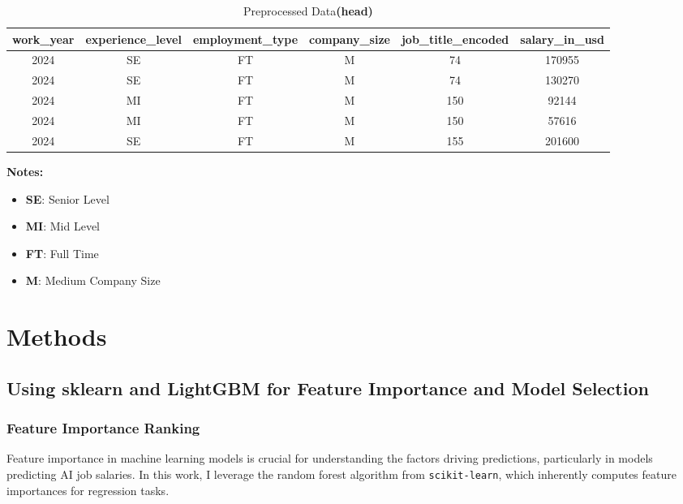 \documentclass[12pt,a4paper]{article}
\begin{document}
\begin{multicols}{2}
\begin{table}[htbp]
    \centering
    \small
    \setlength{\tabcolsep}{0.3pt} %
    \renewcommand{\arraystretch}{0.9} %
    \begin{tabular}{|c|c|c|c|c|c|}
    \hline
    \textbf{work\_year} & \textbf{experience\_level} & \textbf{employment\_type} & \textbf{company\_size} & \textbf{job\_title\_encoded} & \textbf{salary\_in\_usd} \\
    \hline
    2024 & SE & FT & M & 74 & 170955 \\
    2024 & SE & FT & M & 74 & 130270 \\
    2024 & MI & FT & M & 150 & 92144 \\
    2024 & MI & FT & M & 150 & 57616 \\
    2024 & SE & FT & M & 155 & 201600 \\
    \hline
    \end{tabular}
    \caption{Preprocessed Data\textbf{(head)}}
    \label{tab:preprocessed_data}
    \smallskip %
    \small
    \textbf{Notes:}
    \begin{itemize}
        \centering
        \item \textbf{SE}: Senior Level
        \item \textbf{MI}: Mid Level
        \item \textbf{FT}: Full Time
        \item \textbf{M}: Medium Company Size
    \end{itemize}
\end{table}
    
    
    

\section{Methods}
\subsection{Using sklearn and LightGBM for Feature Importance and Model Selection}

\subsubsection{Feature Importance Ranking}
Feature importance in machine learning models is crucial for understanding the factors driving predictions, particularly in models predicting AI job salaries. In this work, I leverage the random forest algorithm from \texttt{scikit-learn}, which inherently computes feature importances for regression tasks. 


\end{multicols}
\end{document}
